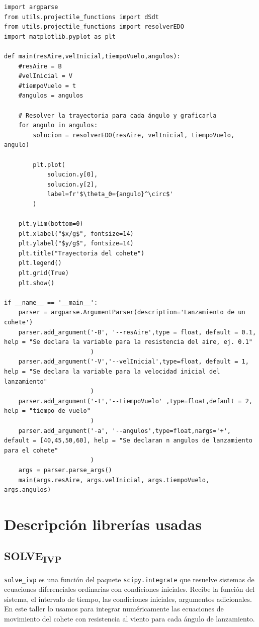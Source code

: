 \documentclass{article}
\begin{document}
\begin{verbatim}
import argparse
from utils.projectile_functions import dSdt
from utils.projectile_functions import resolverEDO
import matplotlib.pyplot as plt

def main(resAire,velInicial,tiempoVuelo,angulos):
    #resAire = B
    #velInicial = V
    #tiempoVuelo = t
    #angulos = angulos 

    # Resolver la trayectoria para cada ángulo y graficarla
    for angulo in angulos:
        solucion = resolverEDO(resAire, velInicial, tiempoVuelo, angulo)

        plt.plot(
            solucion.y[0],
            solucion.y[2],
            label=fr'$\theta_0={angulo}^\circ$'
        )

    plt.ylim(bottom=0)
    plt.xlabel("$x/g$", fontsize=14)
    plt.ylabel("$y/g$", fontsize=14)
    plt.title("Trayectoria del cohete")
    plt.legend()
    plt.grid(True)
    plt.show()

if __name__ == '__main__':
    parser = argparse.ArgumentParser(description='Lanzamiento de un cohete')
    parser.add_argument('-B', '--resAire',type = float, default = 0.1, help = "Se declara la variable para la resistencia del aire, ej. 0.1"
                        )
    parser.add_argument('-V','--velInicial',type=float, default = 1, help = "Se declara la variable para la velocidad inicial del lanzamiento"
                        )
    parser.add_argument('-t','--tiempoVuelo' ,type=float,default = 2, help = "tiempo de vuelo"
                        )
    parser.add_argument('-a', '--angulos',type=float,nargs='+', default = [40,45,50,60], help = "Se declaran n angulos de lanzamiento para el cohete"
                        )
    args = parser.parse_args()
    main(args.resAire, args.velInicial, args.tiempoVuelo, args.angulos)

\end{verbatim}
\section{Descripción librerías usadas}
\label{sec:orgad7fb03}
\subsection{SOLVE\textsubscript{IVP}}
\label{sec:org0563e75}
\texttt{solve\_ivp} es una función del paquete \texttt{scipy.integrate} que resuelve
sistemas de ecuaciones diferenciales ordinarias con condiciones iniciales.
Recibe la función del sistema, el intervalo de tiempo, las condiciones
iniciales, argumentos adicionales. En este taller lo usamos para integrar
numéricamente las ecuaciones de movimiento del cohete con resistencia al
viento para cada ángulo de lanzamiento.
\end{document}
